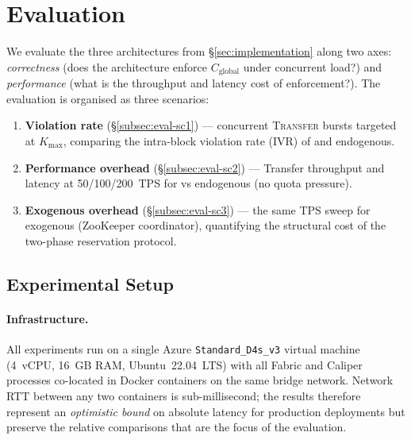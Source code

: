 
\section{Evaluation}
\label{sec:evaluation}

We evaluate the three architectures from \S\ref{sec:implementation} along two
axes: \emph{correctness} (does the architecture enforce $C_\text{global}$ under
concurrent load?) and \emph{performance} (what is the throughput and latency
cost of enforcement?).  The evaluation is organised as three scenarios:

\begin{enumerate}[label=\textbf{Sc.\arabic*}]
  \item \textbf{Violation rate} (\S\ref{subsec:eval-sc1}) — concurrent
    \textsc{Transfer} bursts targeted at $K_\text{max}$, comparing the
    intra-block violation rate (IVR) of  and  endogenous.
  \item \textbf{Performance overhead} (\S\ref{subsec:eval-sc2}) — Transfer
    throughput and latency at 50/100/200~TPS for  vs 
    endogenous (no quota pressure).
  \item \textbf{Exogenous overhead} (\S\ref{subsec:eval-sc3}) — the same TPS
    sweep for  exogenous (ZooKeeper coordinator), quantifying the
    structural cost of the two-phase reservation protocol.
\end{enumerate}

\subsection{Experimental Setup}
\label{subsec:eval-setup}

\paragraph{Infrastructure.}
All experiments run on a single Azure \texttt{Standard\_D4s\_v3} virtual machine
(4~vCPU, 16~GB RAM, Ubuntu~22.04~LTS) with all Fabric and Caliper processes
co-located in Docker containers on the same bridge network.  Network RTT between
any two containers is sub-millisecond; the results therefore represent an
\emph{optimistic bound} on absolute latency for production deployments but
preserve the relative comparisons that are the focus of the evaluation.

